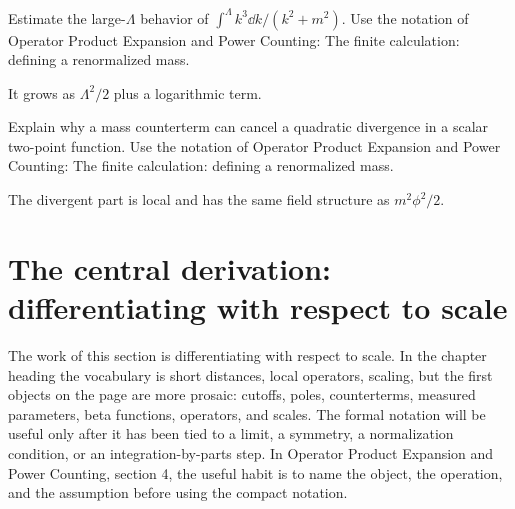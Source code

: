 \begin{exercise}
Estimate the large-\(\Lambda\) behavior of \(\int^\Lambda k^3\dd k/(k^2+m^2)\).  Use the notation of Operator Product Expansion and Power Counting: The finite calculation: defining a renormalized mass.
\begin{answer}
It grows as \(\Lambda^2/2\) plus a logarithmic term.
\end{answer}
\end{exercise}

\begin{exercise}
Explain why a mass counterterm can cancel a quadratic divergence in a scalar two-point function.  Use the notation of Operator Product Expansion and Power Counting: The finite calculation: defining a renormalized mass.
\begin{answer}
The divergent part is local and has the same field structure as \(m^2\phi^2/2\).
\end{answer}
\end{exercise}



\section{The central derivation: differentiating with respect to scale}













The work of this section is differentiating with respect to scale.  In the chapter heading the vocabulary is short distances, local operators, scaling, but the first objects on the page are more prosaic: cutoffs, poles, counterterms, measured parameters, beta functions, operators, and scales.  The formal notation will be useful only after it has been tied to a limit, a symmetry, a normalization condition, or an integration-by-parts step.  In Operator Product Expansion and Power Counting, section 4, the useful habit is to name the object, the operation, and the assumption before using the compact notation.

